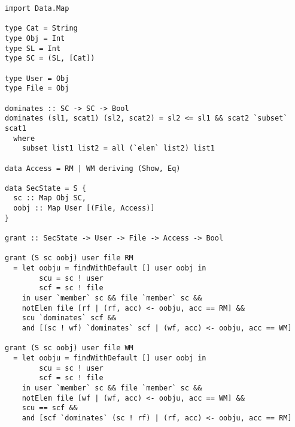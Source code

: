 \documentclass[11pt]{article}
\begin{document}
\begin{lstlisting}
import Data.Map

type Cat = String
type Obj = Int
type SL = Int
type SC = (SL, [Cat])

type User = Obj
type File = Obj

dominates :: SC -> SC -> Bool
dominates (sl1, scat1) (sl2, scat2) = sl2 <= sl1 && scat2 `subset` scat1
  where
    subset list1 list2 = all (`elem` list2) list1

data Access = RM | WM deriving (Show, Eq)

data SecState = S {
  sc :: Map Obj SC,
  oobj :: Map User [(File, Access)]
}

grant :: SecState -> User -> File -> Access -> Bool

grant (S sc oobj) user file RM
  = let oobju = findWithDefault [] user oobj in
        scu = sc ! user
        scf = sc ! file 
    in user `member` sc && file `member` sc &&
    notElem file [rf | (rf, acc) <- oobju, acc == RM] &&
    scu `dominates` scf &&
    and [(sc ! wf) `dominates` scf | (wf, acc) <- oobju, acc == WM]

grant (S sc oobj) user file WM
  = let oobju = findWithDefault [] user oobj in
        scu = sc ! user
        scf = sc ! file 
    in user `member` sc && file `member` sc &&
    notElem file [wf | (wf, acc) <- oobju, acc == WM] &&
    scu == scf &&
    and [scf `dominates` (sc ! rf) | (rf, acc) <- oobju, acc == RM]
\end{lstlisting}


% 
% 
\end{document}
